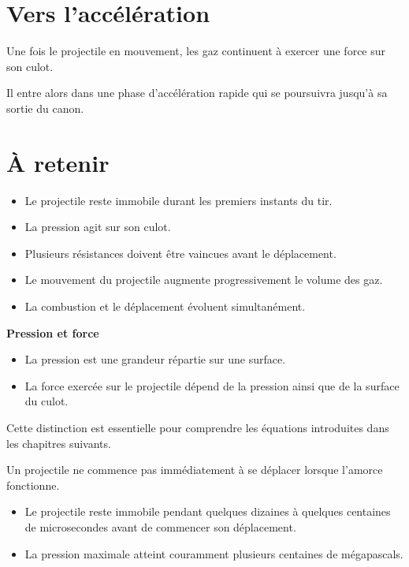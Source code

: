 \section{Vers l'accélération}

Une fois le projectile en mouvement, les gaz continuent à exercer une force sur
son culot.

Il entre alors dans une phase d'accélération rapide qui se poursuivra jusqu'à
sa sortie du canon.

\section{À retenir}

\begin{aretenir}

\begin{itemize}
    \item Le projectile reste immobile durant les premiers instants du tir.
    \item La pression agit sur son culot.
    \item Plusieurs résistances doivent être vaincues avant le déplacement.
    \item Le mouvement du projectile augmente progressivement le volume des gaz.
    \item La combustion et le déplacement évoluent simultanément.
\end{itemize}

\end{aretenir}

\begin{rigueur}{\textbf{Pression et force}}

\begin{itemize}
    \item La pression est une grandeur répartie sur une surface.
    \item La force exercée sur le projectile dépend de la pression ainsi que de la surface
du culot.
\end{itemize}
Cette distinction est essentielle pour comprendre les équations introduites
dans les chapitres suivants.

\end{rigueur}

\begin{ideerecue}

Un projectile ne commence pas immédiatement à se déplacer lorsque l'amorce
fonctionne.

\end{ideerecue}

\begin{ordredegrandeur}

\begin{itemize}
    \item Le projectile reste immobile pendant quelques dizaines à quelques centaines de microsecondes avant de commencer son déplacement.
    \item La pression maximale atteint couramment plusieurs centaines de mégapascals.
\end{itemize}
\end{ordredegrandeur}

